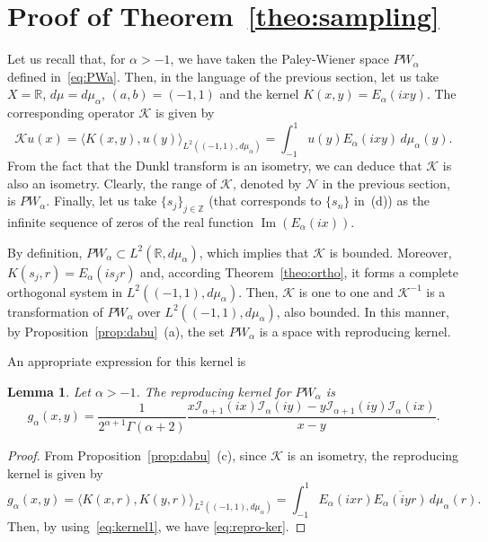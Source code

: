 \documentclass[11pt]{amsart}
\theoremstyle{plain}
\newtheorem{Lem}{Lemma}
\renewcommand{\Im}{\operatorname{Im}}
\begin{document}
\section{Proof of Theorem~\ref{theo:sampling}}
\label{seq:sampling}

Let us recall that, for $\alpha > -1$, we have taken the Paley-Wiener space $PW_\alpha$ defined in~\eqref{eq:PWa}.
Then, in the language of the previous section, let us take $X = \mathbb{R}$,
$d\mu = d\mu_\alpha$, $(a,b) = (-1,1)$ and the kernel $K(x,y) = E_{\alpha}(ixy)$.
The corresponding operator $\mathcal{K}$ is given by
\begin{equation}
\label{eq:K-op}
  \mathcal{K}u(x) = \langle K(x,y),u(y)\rangle_{L^2((-1,1),d\mu_{\alpha})}
  = \int_{-1}^{1} u(y)E_{\alpha}(ixy)\,d\mu_{\alpha}(y).
\end{equation}
From the fact that the Dunkl transform is an isometry, we can deduce that $\mathcal{K}$ is also an isometry. Clearly, the range of $\mathcal{K}$, denoted by $\mathcal{N}$ in the previous section, is $PW_\alpha$. Finally, let us take $\{s_j\}_{j\in\mathbb{Z}}$ (that corresponds to $\{s_n\}$ in~(d)) as the infinite sequence of zeros of the real function $\Im(E_{\alpha}(ix))$.

By definition, $PW_\alpha \subset L^2(\mathbb{R},d\mu_\alpha)$, which implies that $\mathcal{K}$ is bounded.
Moreover, $K(s_j,r) = E_\alpha(is_jr)$ and, according Theorem~\ref{theo:ortho}, it forms a complete orthogonal system in $L^2((-1,1),d\mu_\alpha)$.
Then, $\mathcal{K}$ is one to one and $\mathcal{K}^{-1}$ is a transformation of $PW_\alpha$ over $L^2((-1,1),d\mu_\alpha)$, also bounded.
In this manner, by Proposition~\ref{prop:dabu}~(a), the set $PW_\alpha$ is a space with reproducing kernel.

An appropriate expression for this kernel is

\begin{Lem}
Let $\alpha>-1$. The reproducing kernel for $PW_\alpha$ is
\begin{equation}
\label{eq:repro-ker}
  g_\alpha(x,y) = \frac{1}{2^{\alpha+1}\Gamma(\alpha+2)}
  \frac{x\mathcal{I}_{\alpha+1}(ix) \mathcal{I}_{\alpha}(iy)
    - y\mathcal{I}_{\alpha+1}(iy) \mathcal{I}_{\alpha}(ix)}{x-y}.
\end{equation}
\end{Lem}

\begin{proof}
From Proposition~\ref{prop:dabu}~(c), since $\mathcal{K}$ is an isometry, the reproducing kernel is given by
\[
  g_\alpha(x,y) = \langle K(x,r), K(y,r)\rangle_{L^2((-1,1),d\mu_\alpha)}
  = \int_{-1}^{1}E_\alpha(ixr)\overline{E_\alpha(iyr)}\,d\mu_{\alpha}(r).
\]
Then, by using~\eqref{eq:kernel1}, we have \eqref{eq:repro-ker}.
\end{proof}
\end{document}
